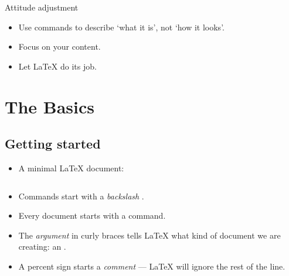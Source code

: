 \documentclass{beamer}
\begin{document}
    
    \begin{frame}[fragile]{Attitude adjustment}
    
    \begin{itemize}
    \item Use commands to describe `what it is', not `how it looks'.
    \item Focus on your content.
    \item Let \LaTeX{} do its job.
    \end{itemize}
    \end{frame}
    
    \section{The Basics}
    
    \subsection{Getting started}
    \begin{frame}[fragile]{\insertsubsection}
    \begin{itemize}
    \item A minimal \LaTeX{} document:
    \inputminted[frame=single]{latex}{basics.tex}
    \item Commands start with a \emph{backslash} \keystrokebftt{\bs}.
    \item Every document starts with a  command.
    \item The \emph{argument} in curly braces \keystrokebftt{\{} \keystrokebftt{\}} tells \LaTeX{} what kind of document we are creating: an .
    \item A percent sign \keystrokebftt{\%} starts a \emph{comment} --- \LaTeX{}
    will ignore the rest of the line.
    \end{itemize}
    \end{frame}
    
\end{document}
